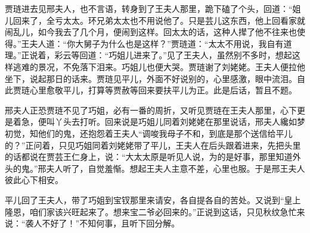 \begin{parag}
    贾琏进去见邢夫人，也不言语，转身到了王夫人那里，跪下磕了个头，回道：“姐儿回来了，全亏太太。环兄弟太太也不用说他了。只是芸儿这东西，他上回看家就闹乱儿，如今我去了几个月，便闹到这样。回太太的话，这种人撵了他不往来也使得。”王夫人道：“你大舅子为什么也是这样？”贾琏道：“太太不用说，我自有道理。”正说着，彩云等回道：“巧姐儿进来了。”见了王夫人，虽然别不多时，想起这样逃难的景况，不免落下泪来。巧姐儿也便大哭。贾琏谢了刘姥姥。王夫人便拉他坐下，说起那日的话来。贾琏见平儿，外面不好说别的，心里感激，眼中流泪。自此贾琏心里愈敬平儿，打算等贾赦等回来要扶平儿为正。此是后话，暂且不题。
\end{parag}


\begin{parag}
    邢夫人正恐贾琏不见了巧姐，必有一番的周折，又听见贾琏在王夫人那里，心下更是着急，便叫丫头去打听。回来说是巧姐儿同着刘姥姥在那里说话，邢夫人纔如梦初觉，知他们的鬼，还抱怨着王夫人“调唆我母子不和，到底是那个送信给平儿的？”正问着，只见巧姐同着刘姥姥带了平儿，王夫人在后头跟着进来，先把头里的话都说在贾芸王仁身上，说：“大太太原是听见人说，为的是好事，那里知道外头的鬼。”邢夫人听了，自觉羞惭。想起王夫人主意不差，心里也服。于是邢王夫人彼此心下相安。
\end{parag}


\begin{parag}
    平儿回了王夫人，带了巧姐到宝钗那里来请安，各自提各自的苦处。又说到“皇上隆恩，咱们家该兴旺起来了。想来宝二爷必回来的。”正说到这话，只见秋纹急忙来说：“袭人不好了！”不知何事，且听下回分解。
\end{parag}